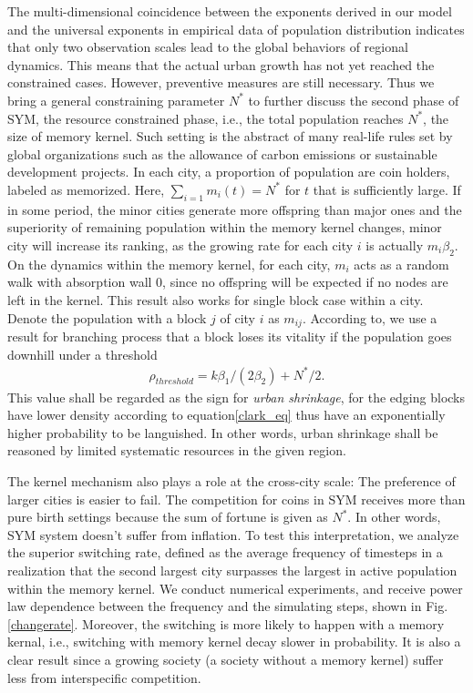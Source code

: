 \documentclass[reprint,unsortedaddress,amsmath,amssymb,aps,prl,showkeys]{revtex4-2}
\begin{document}
The multi-dimensional coincidence between the exponents derived in our model and the universal exponents in empirical data of population distribution indicates that only two observation scales lead to the global behaviors of regional dynamics. This means that the actual urban growth has not yet reached the constrained cases. However, preventive measures are still necessary. Thus we bring a general constraining parameter $N^*$ to further discuss the second phase of SYM, the resource constrained phase, i.e., the total population reaches $N^*$, the size of memory kernel. Such setting is the abstract of many real-life rules set by global organizations such as the allowance of carbon emissions or sustainable development projects. In each city, a proportion of population are coin holders, labeled as memorized. Here, $\sum_{i=1} m_i(t) = N^*$ for $t$ that is sufficiently large. If in some period, the minor cities generate more offspring than major ones and the superiority of remaining population within the memory kernel changes, minor city will increase its ranking, as the growing rate for each city $i$ is actually $m_i\beta_2$. On the dynamics within the memory kernel, for each city, $m_i$ acts as a random walk with absorption wall $0$, since no offspring will be expected if no nodes are left in the kernel. This result also works for single block case within a city. Denote the population with a block $j$ of city $i$ as $m_{ij}$. According to\@\cite{durrett1999essentials}, we use a result for branching process that a block loses its vitality if the population goes downhill under a threshold \begin{align}\rho_{threshold} = k\beta_1/(2\beta_2)+N^*/2.\end{align} This value shall be regarded as the sign for \emph{urban shrinkage}, for the edging blocks have lower density according to equation\@\ref{clark_eq} thus have an exponentially higher probability to be languished. In other words, urban shrinkage shall be reasoned by limited systematic resources in the given region. 

The kernel mechanism also plays a role at the cross-city scale: The preference of larger cities is easier to fail. The competition for coins in SYM receives more than pure birth settings because the sum of fortune is given as $N^*$. In other words, SYM system doesn't suffer from inflation. To test this interpretation, we analyze the superior switching rate, defined as the average frequency of timesteps in a realization that the second largest city surpasses the largest in active population within the memory kernel. We conduct numerical experiments, and receive power law dependence between the frequency and the simulating steps, shown in Fig.\@\ref{changerate}. Moreover, the switching is more likely to happen with a memory kernal, i.e., switching with memory kernel decay slower in probability. It is also a clear result since a growing society (a society without a memory kernel) suffer less from interspecific competition.
\end{document}
